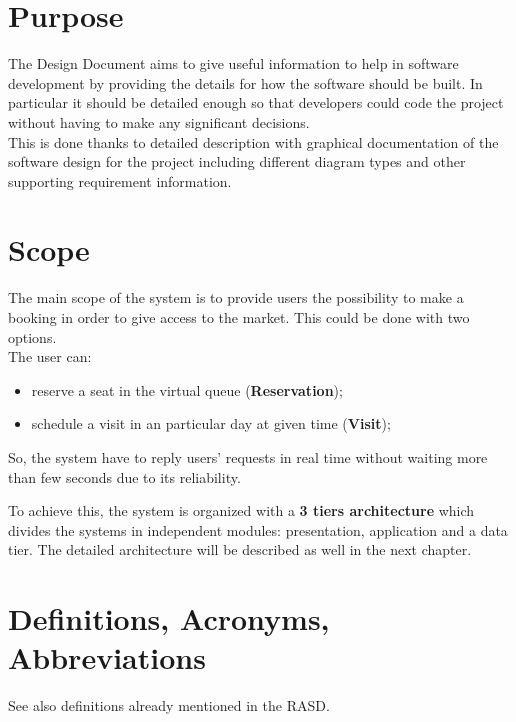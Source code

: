 \section{Purpose}
The Design Document aims to give useful information to help in software development by providing the details for how the software should be built. In particular it should be detailed enough so that developers could code the project without having to make any significant decisions. \\
This is done thanks to detailed description with graphical documentation of the software design for the project including different diagram types and other supporting requirement information.
\section{Scope}
The main scope of the system is to provide users the possibility to make a booking in order to give access to the market. This could be done with two options.\\
The user can:
\begin{itemize}
\item reserve a seat in the virtual queue (\textbf{Reservation});
\item schedule a visit in an particular day at given time (\textbf{Visit});
\end{itemize}
So, the system have to reply users' requests in real time without waiting more than few seconds due to its reliability. \par
To achieve this, the system is organized with a \textbf{3 tiers architecture} which divides the systems in independent modules: presentation, application and a data tier. The detailed architecture will be described as well in the next chapter.

\bigskip
\bigskip
\section{Definitions, Acronyms, Abbreviations}
See also definitions already mentioned in the RASD.
